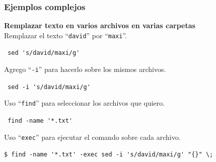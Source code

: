 \documentclass{beamer}
\begin{document}
\begin{frame}[fragile,t]
    \frametitle{\small Ejemplos complejos}
    \textbf{Remplazar texto en varios archivos en varias carpetas}\\
    \vspace{0.5cm}
    \small \pause
    Remplazar el texto ``\texttt{david}'' por ``\texttt{maxi}''.\\
    \vspace{-0.5cm}
    \begin{block}{\vspace*{-3ex}}
    \verb: sed 's/david/maxi/g':
    \vspace*{0.5ex}
    \end{block}
    \vspace{0.3cm}
    \small \pause
    Agrego ``\texttt{-i}'' para hacerlo sobre los mismos archivos.\\
    \vspace{-0.5cm}
    \begin{block}{\vspace*{-3ex}}
    \verb: sed -i 's/david/maxi/g':
    \vspace*{0.5ex}
    \end{block}
    \vspace{0.3cm}
    \small \pause
    Uso ``\texttt{find}'' para seleccionar los archivos que quiero.\\
    \vspace{-0.5cm}
    \begin{block}{\vspace*{-3ex}}
    \verb: find -name '*.txt':
    \vspace*{0.5ex}
    \end{block}
    \vspace{0.3cm}
    \small \pause
    Uso ``\texttt{exec}'' para ejecutar el comando sobre cada archivo.\\
    \vspace{-0.5cm}
    \begin{block}{\vspace*{-3ex}}
    \texttt{\$}\verb: find -name '*.txt' -exec sed -i 's/david/maxi/g' "{}" \;:
    \vspace*{0.5ex}
    \end{block}
\end{frame}
\end{document}
